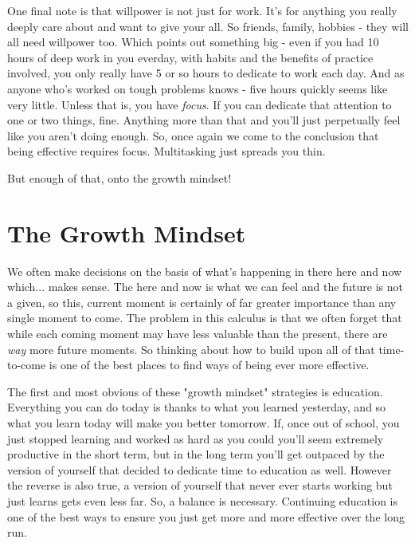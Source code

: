 \documentclass[11pt]{book}
\begin{document}
One final note is that willpower is not just for work. It's for anything you really deeply care about and want to give your all. So friends, family, hobbies - they will all need willpower too. Which points out something big - even if you had 10 hours of deep work in you everday, with habits and the benefits of practice involved, you only really have 5 or so hours to dedicate to work each day. And as anyone who's worked on tough problems knows - five hours quickly seems like very little. Unless that is, you have \textit{focus}. If you can dedicate that attention to one or two things, fine. Anything more than that and you'll just perpetually feel like you aren't doing enough. So, once again we come to the conclusion that being effective requires focus. Multitasking just spreads you thin.
\newline

But enough of that, onto the growth mindset!

\section{The Growth Mindset}
We often make decisions on the basis of what's happening in there here and now which... makes sense. The here and now is what we can feel and the future is not a given, so this, current moment is certainly of far greater importance than any single moment to come. The problem in this calculus is that we often forget that while each coming moment may have less valuable than the present, there are \textit{way} more future moments. So thinking about how to build upon all of that time-to-come is one of the best places to find ways of being ever more effective.
\newline

The first and most obvious of these "growth mindset" strategies is education. Everything you can do today is thanks to what you learned yesterday, and so what you learn today will make you better tomorrow. If, once out of school, you just stopped learning and worked as hard as you could you'll seem extremely productive in the short term, but in the long term you'll get outpaced by the version of yourself that decided to dedicate time to education as well. However the reverse is also true, a version of yourself that never ever starts working but just learns gets even less far. So, a balance is necessary. Continuing education is one of the best ways to ensure you just get more and more effective over the long run. 
\newline
\end{document}
